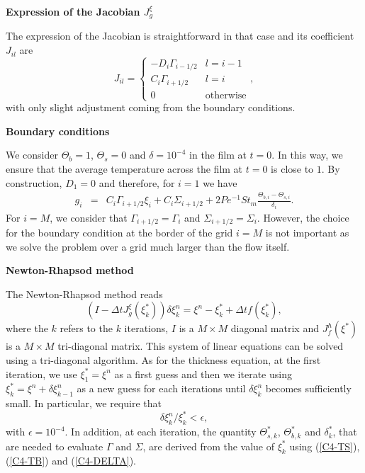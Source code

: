 \vspace{.5cm}  \textbf{Expression   of  the   Jacobian  $J_{g}^{\xi}$}
\vspace{.5cm}

The expression of the Jacobian is straightforward in that case and its
coefficient $J_{il}$ are
\begin{equation}
  J_{il}=
  \begin{cases}
    -D_i\Gamma_{i-1/2}&
    l = i-1\\
    C_i\Gamma_{i+1/2} & l = i \\
    0 & \text{otherwise}
  \end{cases},
  \label{C4-C2-eq12}
\end{equation}
with only slight adjustment coming from the boundary conditions.

\vspace{.5cm} \textbf{Boundary conditions} \vspace{.5cm}

We consider $\Theta_b =1$, $\Theta_s=0$  and $\delta = 10^{-4}$ in the
film at  $t=0$. In this  way, we  ensure that the  average temperature
across the film at $t=0$ is close to $1$. By construction, $D_1=0$ and
therefore, for $i=1$ we have
\begin{eqnarray}
  g_i &=& C_i\Gamma_{i+1/2}\xi_{i}+ C_i\Sigma_{i+1/2} +2Pe^{-1}St_m\frac{\Theta_{b,i}-\Theta_{s,i}}{\delta_i}.
\end{eqnarray}
For   $i=M$,   we    consider   that   $\Gamma_{i+1/2}=\Gamma_i$   and
$\Sigma_{i+1/2}=\Sigma_i$.   However,  the  choice  for  the  boundary
condition at the border of the grid $i=M$ is not important as we solve
the problem over a grid much larger than the flow itself.

\vspace{.5cm} \textbf{Newton-Rhapsod method} \vspace{.5cm}

The Newton-Rhapsod method reads
\begin{equation}
  (I-\Delta tJ^{\xi}_{g}(\xi_k^*))\delta \xi_k^n=\xi^n-\xi_k^*+\Delta t f(\xi_k^*),
\end{equation}
where the  $k$ refers  to the $k$  iterations, $I$ is  a $M  \times M$
diagonal  matrix and  $J_f^h(\xi^*)$ is  a $M  \times M$  tri-diagonal
matrix.   This  system of  linear  equations  can  be solved  using  a
tri-diagonal algorithm.  As  for the thickness equation,  at the first
iteration,  we use  $\xi^*_1 =  \xi^n$ as  a first  guess and  then we
iterate using $\xi^*_k = \xi^n+\delta  \xi_{k-1}^n$ as a new guess for
each iterations  until $\delta \xi^n_{k}$ becomes  sufficiently small.
In particular, we require that
\begin{equation}
  \delta \xi^n_k/\xi^*_{k}<\epsilon,
\end{equation}
with  $\epsilon  = 10^{-4}$.   In  addition,  at each  iteration,  the
quantity $\Theta^*_{s,k}$, $\Theta^*_{b,k}$ and $\delta^*_k$, that are
needed to evaluate  $\Gamma$ and $\Sigma$, are derived  from the value
of $\xi^*_{k}$ using (\ref{C4-TS}), (\ref{C4-TB}) and (\ref{C4-DELTA}).

